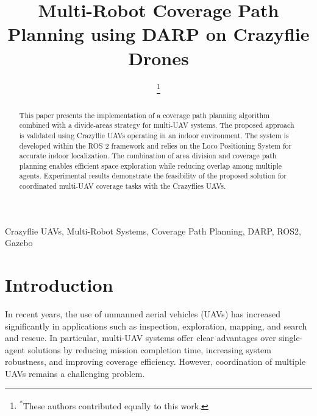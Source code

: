 \documentclass[conference]{IEEEtran}
\begin{document}
\title{Multi-Robot Coverage Path Planning using DARP on Crazyflie Drones}

\author{
\and
{}
\and
{}
\thanks{\textsuperscript{*}These authors contributed equally to this work.}
}

\maketitle

\begin{abstract}
This paper presents the implementation of a coverage path planning algorithm combined with a divide-areas strategy for multi-UAV systems. The proposed approach is validated using Crazyflie UAVs operating in an indoor environment. The system is developed within the ROS 2 framework and relies on the Loco Positioning System for accurate indoor localization. The combination of area division and coverage path planning enables efficient space exploration while reducing overlap among multiple agents. Experimental results demonstrate the feasibility of the proposed solution for coordinated multi-UAV coverage tasks with the Crazyflies UAVs.
\end{abstract}

\begin{IEEEkeywords}
Crazyflie UAVs, Multi-Robot Systems, Coverage Path Planning, DARP, ROS2, Gazebo
\end{IEEEkeywords}

\section{Introduction}
In recent years, the use of unmanned aerial vehicles (UAVs) has increased significantly in applications such as inspection, exploration, mapping, and search and rescue. In particular, multi-UAV systems offer clear advantages over single-agent solutions by reducing mission completion time, increasing system robustness, and improving coverage efficiency. However, coordination of multiple UAVs remains a challenging problem.
\end{document}
